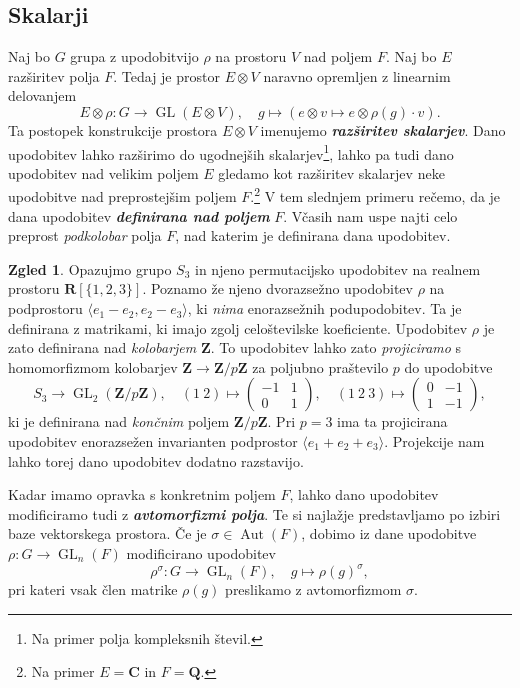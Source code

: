 \documentclass[11pt]{book}
\def\ZZ{\mathbf{Z}}
\def\QQ{\mathbf{Q}}
\def\RR{\mathbf{R}}
\def\CC{\mathbf{C}}
\DeclareMathOperator\Aut{Aut}
\DeclareMathOperator\GL{GL}
\def\definicija{\color{rdeca}\bf\em}
\theoremstyle{definition}
\theoremstyle{zgled}
\newtheorem*{zgled}{Zgled}
\theoremstyle{odprtproblem}
\theoremstyle{domacanaloga}
\theoremstyle{izrek}
\begin{document}
\subsection{Skalarji}

Naj bo $G$ grupa z upodobitvijo $\rho$ na prostoru $V$ nad poljem $F$. Naj bo $E$ razširitev polja $F$. Tedaj je prostor $E \otimes V$ naravno opremljen z linearnim delovanjem
\[
    E \otimes \rho \colon G \to \GL(E \otimes V), \quad
    g \mapsto \left( e \otimes v \mapsto e  \otimes \rho(g) \cdot v \right).
\]
Ta postopek konstrukcije prostora $E \otimes V$ imenujemo {\definicija razširitev skalarjev}. Dano upodobitev lahko razširimo do ugodnejših skalarjev\footnote{Na primer polja kompleksnih števil.}, lahko pa tudi dano upodobitev nad velikim poljem $E$ gledamo kot razširitev skalarjev neke upodobitve nad preprostejšim poljem $F$.\footnote{Na primer $E = \CC$ in $F = \QQ$.} V tem slednjem primeru rečemo, da je dana upodobitev {\definicija definirana nad poljem} $F$. Včasih nam uspe najti celo preprost \emph{podkolobar} polja $F$, nad katerim je definirana dana upodobitev.

\begin{zgled}
Opazujmo grupo $S_3$ in njeno permutacijsko upodobitev na realnem prostoru $\RR[\{ 1, 2, 3 \}]$. Poznamo že njeno dvorazsežno upodobitev $\rho$ na podprostoru $\langle e_1 - e_2, e_2 - e_3 \rangle$, ki \emph{nima} enorazsežnih podupodobitev. Ta je definirana z matrikami, ki imajo zgolj celoštevilske koeficiente. Upodobitev $\rho$ je zato definirana nad \emph{kolobarjem} $\ZZ$. To upodobitev lahko zato \emph{projiciramo} s homomorfizmom kolobarjev $\ZZ \to \ZZ/p\ZZ$ za poljubno praštevilo $p$ do upodobitve
\[
    S_3 \to {\textstyle \GL_2(\ZZ/p\ZZ)}, \quad
    (1 \ 2) \mapsto \begin{pmatrix} 
        -1 & 1 \\ 0 & 1 
    \end{pmatrix}, \quad
    (1 \ 2 \ 3) \mapsto \begin{pmatrix} 
        0 & -1 \\ 1 & -1
    \end{pmatrix},
\]
ki je definirana nad \emph{končnim} poljem $\ZZ/p\ZZ$. Pri $p = 3$ ima ta projicirana upodobitev enorazsežen invarianten podprostor $\langle e_1 + e_2 + e_3 \rangle$. Projekcije nam lahko torej dano upodobitev dodatno razstavijo.
\end{zgled}

Kadar imamo opravka s konkretnim poljem $F$, lahko dano upodobitev modificiramo tudi z {\definicija avtomorfizmi polja}. Te si najlažje predstavljamo po izbiri baze vektorskega prostora. Če je $\sigma \in \Aut(F)$, dobimo iz dane upodobitve  $\rho \colon G \to \GL_n(F)$ modificirano upodobitev
\[
    \rho^\sigma \colon G \to {\textstyle \GL_n(F)}, \quad
    g \mapsto \rho(g)^\sigma,
\]
pri kateri vsak člen matrike $\rho(g)$ preslikamo z avtomorfizmom $\sigma$.
\end{document}
